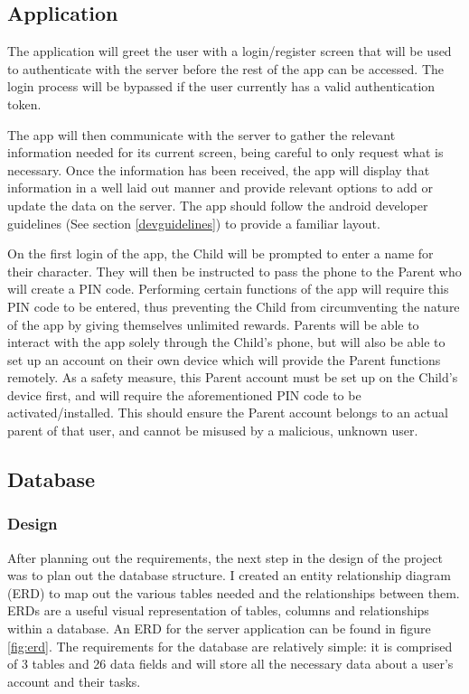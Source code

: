 \subsection{Application}
The application will greet the user with a login/register screen that will be used to authenticate with the server before the rest of the app can be accessed.
The login process will be bypassed if the user currently has a valid authentication token.

The app will then communicate with the server to gather the relevant information needed for its current screen, being careful to only request what is necessary.
Once the information has been received, the app will display that information in a well laid out manner and provide relevant options to add or update the data on the server.
The app should follow the android developer guidelines (See section \ref{devguidelines}) to provide a familiar layout.

On the first login of the app, the Child will be prompted to enter a name for their character. 
They will then be instructed to pass the phone to the Parent who will create a PIN code.
Performing certain functions of the app will require this PIN code to be entered, thus preventing the Child from circumventing the nature of the app by giving themselves unlimited rewards.
Parents will be able to interact with the app solely through the Child's phone, but will also be able to set up an account on their own device which will provide the Parent functions remotely.
As a safety measure, this Parent account must be set up on the Child's device first, and will require the aforementioned PIN code to be activated/installed. 
This should ensure the Parent account belongs to an actual parent of that user, and cannot be misused by a malicious, unknown user. 

\subsection{Database}
\subsubsection{Design}
After planning out the requirements, the next step in the design of the project was to plan out the database structure.
I created an entity relationship diagram (ERD) to map out the various tables needed and the relationships between them.
ERDs are a useful visual representation of tables, columns and relationships within a database.
An ERD for the server application can be found in figure \ref{fig:erd}.
The requirements for the database are relatively simple: it is comprised of 3 tables and 26 data fields and will store all the necessary data about a user's account and their tasks.

